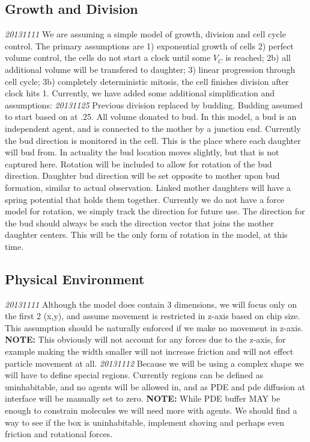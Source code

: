 \documentclass{article}
\begin{document}
\subsection{Growth and Division}
\emph{20131111} We are assuming a simple model of growth, division and cell cycle control\cite{Charvin2009}.
The primary assumptions are 1) exponential growth of cells
2) perfect volume control,
the cells do not start a clock until some $V_C$ is reached;
2b) all additional volume will be transfered to daughter;
3) linear progression through cell cycle;
3b) completely deterministic mitosis, 
the cell finishes division after clock hits 1.
Currently, we have added some additional simplification and assumptions:
\emph{20131125}
Previous division replaced by budding.
Budding assumed to start based on \cite{Charvin2009} at .25.
All volume donated to bud.
In this model, a bud is an independent agent,
and is connected to the mother by a junction end.
Currently the bud direction is monitored in the cell.
This is the place where each daughter will bud from.
In actuality the bud location moves slightly, but that is not captured here.
Rotation will be included to allow for rotation of the bud direction.
Daughter bud direction will be set opposite to mother upon bud formation, similar to actual observation.
Linked mother daughters will have a spring potential that holds them together.
Currently we do not have a force model for rotation,
we simply track the direction for future use. 
The direction for the bud should always be such the direction vector that joins the mother daughter centers.
This will be the only form of rotation in the model, at this time.


\subsection{Physical Environment}
\emph{20131111} Although the model does contain 3 dimensions,
we will focus only on the first 2 (x,y), 
and assume movement is restricted in z-axis based on chip size.
This assumption should be naturally enforced if we make no movement in z-axis.
\textbf{NOTE:} This obviously will not account for any forces due to the z-axis,
for example making the width smaller will not increase friction and will not effect particle movement at all.
\emph{20131112} Because we will be using a complex shape we will have to define special regions.
Currently regions can be defined as uninhabitable, and no agents will be allowed in, and
as PDE and pde diffusion at interface will be manually set to zero.
\textbf{NOTE:} While PDE buffer MAY be enough to constrain molecules we will need more with agents.
We should find a way to see if the box is uninhabitable, 
implement shoving and perhaps even friction and rotational forces.
\end{document}
